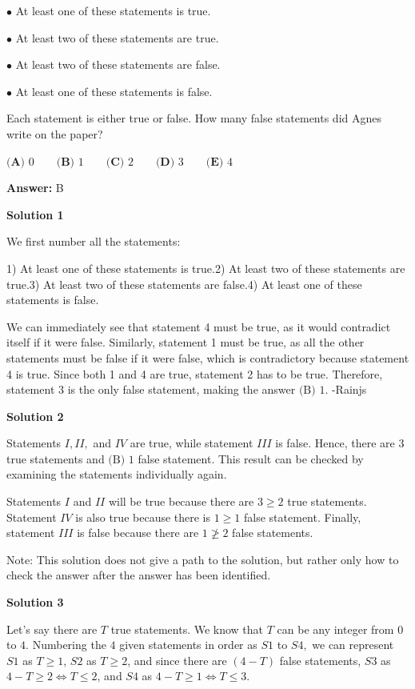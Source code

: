 \begin{enumerate}
 $\bullet$ At least one of these statements is true.


 $\bullet$ At least two of these statements are true.


 $\bullet$ At least two of these statements are false.


 $\bullet$ At least one of these statements is false.


 Each statement is either true or false. How many false statements did Agnes write on the paper?


 $\textbf{(A) } 0 \qquad\textbf{(B) } 1 \qquad\textbf{(C) } 2 \qquad\textbf{(D) } 3 \qquad\textbf{(E) } 4$

 \textbf{Answer: }B



\textbf{Solution 1}

We first number all the statements:

 1) At least one of these statements is true.2) At least two of these statements are true.3) At least two of these statements are false.4) At least one of these statements is false.

 We can immediately see that statement 4 must be true, as it would contradict itself if it were false. Similarly, statement 1 must be true, as all the other statements must be false if it were false, which is contradictory because statement 4 is true. Since both 1 and 4 are true, statement 2 has to be true. Therefore, statement 3 is the only false statement, making the answer $\boxed{\text{(B) }1}$. -Rainjs

 



\textbf{Solution 2}

Statements $I,II,$ and $IV$ are true, while statement $III$ is false. Hence, there are $3$ true statements and $\boxed{\text{(B) }1}$ false statement. This result can be checked by examining the statements individually again.

 Statements $I$ and $II$ will be true because there are $3\ge2$ true statements. Statement $IV$ is also true because there is $1\ge1$ false statement. Finally, statement $III$ is false because there are $1\ngeq2$ false statements.

 Note: This solution does not give a path to the solution, but rather only how to check the answer after the answer has been identified.

 



\textbf{Solution 3}

Let's say there are $T$ true statements. We know that $T$ can be any integer from $0$ to $4$. Numbering the $4$ given statements in order as $S1$ to $S4,$ we can represent $S1$ as $T \geq 1$, $S2$ as $T \geq 2$, and since there are $(4-T)$ false statements, $S3$ as $4-T \geq 2 \iff T \leq 2$, and $S4$ as $4-T \geq 1 \iff T \leq 3$.


\end{enumerate}
